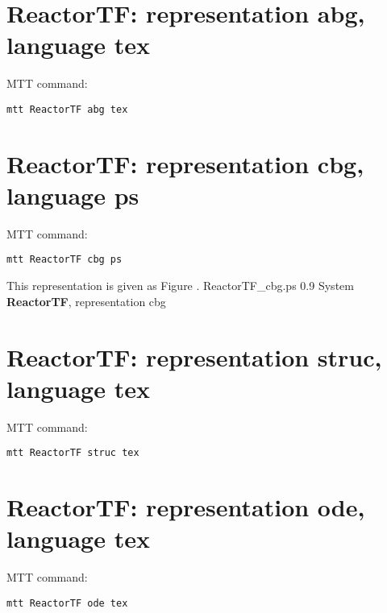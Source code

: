 

\section{\textbf{ReactorTF}: representation \textbf{abg}, language \textbf{tex}}
\label{sec:ReactorTF_abg.tex}


MTT command:
\begin{verbatim}
mtt ReactorTF abg tex 
\end{verbatim}
  


\section{\textbf{ReactorTF}: representation \textbf{cbg}, language \textbf{ps}}
\label{sec:ReactorTF_cbg.ps}


MTT command:
\begin{verbatim}
mtt ReactorTF cbg ps 
\end{verbatim}
This representation is given as Figure .
    {ReactorTF_cbg.ps}
    {0.9}
    {System \textbf{ReactorTF}, representation cbg}


\section{\textbf{ReactorTF}: representation \textbf{struc}, language \textbf{tex}}
\label{sec:ReactorTF_struc.tex}


MTT command:
\begin{verbatim}
mtt ReactorTF struc tex 
\end{verbatim}
  


\section{\textbf{ReactorTF}: representation \textbf{ode}, language \textbf{tex}}
\label{sec:ReactorTF_ode.tex}


MTT command:
\begin{verbatim}
mtt ReactorTF ode tex 
\end{verbatim}
  


